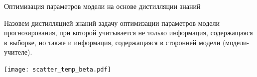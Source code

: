 \documentclass[10pt, aspectratio=169]{beamer}
\begin{document}
\begin{frame}{Оптимизация параметров модели на основе дистилляции знаний}










Назовем {\color{red}дистилляцией знаний} задачу оптимизации параметров модели прогнозирования, при которой учитывается не только информация, содержащаяся в выборке, но также и информация, содержащаяся в сторонней модели (модели-учителе).

\centering
\texttt{[image: scatter\_temp\_beta.pdf]}
\end{frame}
\end{document}
